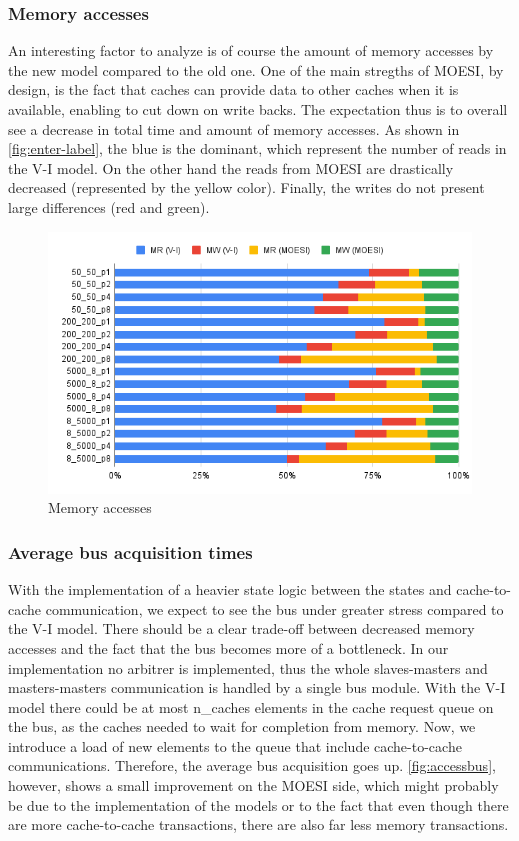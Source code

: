 \subsubsection{Memory accesses}
An interesting factor to analyze is of course the amount of memory accesses by the new model compared to the old one. One of the main stregths of MOESI, by design, is the fact that caches can provide data to other caches when it is available, enabling to cut down on write backs. The expectation thus is to overall see a decrease in total time and amount of memory accesses. As shown in \autoref{fig:enter-label}, the blue is the dominant, which represent the number of reads in the V-I model. On the other hand the reads from MOESI are drastically decreased (represented by the yellow color). Finally, the writes do not present large differences (red and green).

\begin{figure}[H]
    \centering
    \includegraphics[scale=0.4]{Figures/memory accesses.png}
    \caption{Memory accesses}
    \label{fig:enter-label}
\end{figure}

\subsubsection{Average bus acquisition times}
With the implementation of a heavier state logic between the states and cache-to-cache communication, we expect to see the bus under greater stress compared to the V-I model. There should be a clear trade-off between decreased memory accesses and the fact that the bus becomes more of a bottleneck. In our implementation no arbitrer is implemented, thus the whole slaves-masters and masters-masters communication is handled by a single bus module. With the V-I model there could be at most n\_caches elements in the cache request queue on the bus, as the caches needed to wait for completion from memory. Now, we introduce a load of new elements to the queue that include cache-to-cache communications. Therefore, the average bus acquisition goes up. \autoref{fig:accessbus}, however, shows a small improvement on the MOESI side, which might probably be due to the implementation of the models or to the fact that even though there are more cache-to-cache transactions, there are also far less memory transactions.

